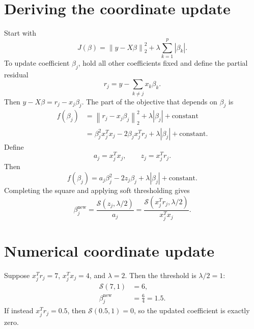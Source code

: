 \documentclass[11pt,a4paper,oneside]{book}
\newcommand{\norm}[1]{\left\lVert #1\right\rVert}
\newcommand{\abs}[1]{\left|#1\right|}
\newcommand{\soft}{\mathcal{S}}
\begin{document}
\section{Deriving the coordinate update}
Start with
\begin{equation}
  J(\beta)=\norm{y-X\beta}_2^2+\lambda\sum_{k=1}^p\abs{\beta_k}.
\end{equation}
To update coefficient $\beta_j$, hold all other coefficients fixed and define the partial residual
\begin{equation}
  \boxed{r_j=y-\sum_{k\neq j}x_k\beta_k.}
\end{equation}
Then $y-X\beta=r_j-x_j\beta_j$. The part of the objective that depends on $\beta_j$ is
\begin{align}
  f(\beta_j)&=\norm{r_j-x_j\beta_j}_2^2+\lambda\abs{\beta_j}+\text{constant}\\
  &=\beta_j^2x_j^Tx_j-2\beta_jx_j^Tr_j+\lambda\abs{\beta_j}+\text{constant}.
\end{align}
Define
\begin{equation}
  a_j=x_j^Tx_j,\qquad z_j=x_j^Tr_j.
\end{equation}
Then
\begin{equation}
  f(\beta_j)=a_j\beta_j^2-2z_j\beta_j+\lambda\abs{\beta_j}+\text{constant}.
\end{equation}
Completing the square and applying soft thresholding gives
\begin{equation}
  \boxed{\beta_j^{\mathrm{new}}=\frac{\soft(z_j,\lambda/2)}{a_j}
  =\frac{\soft(x_j^Tr_j,\lambda/2)}{x_j^Tx_j}.}
  \label{eq:coordinate-update}
\end{equation}

\section{Numerical coordinate update}
Suppose $x_j^Tr_j=7$, $x_j^Tx_j=4$, and $\lambda=2$. Then the threshold is $\lambda/2=1$:
\begin{align}
  \soft(7,1)&=6,\\
  \beta_j^{\mathrm{new}}&=\frac{6}{4}=1.5.
\end{align}
If instead $x_j^Tr_j=0.5$, then $\soft(0.5,1)=0$, so the updated coefficient is exactly zero.
\end{document}
